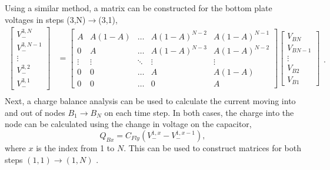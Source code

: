 \documentclass[conference]{article}
\begin{document}
	Using a similar method, a matrix can be constructed for the bottom plate voltages in steps (3,N)$\rightarrow$(3,1),
	\begin{equation}
	\begin{split}
	\begin{bmatrix}
	V_-^{3,N} \\
	V_-^{3,N-1} \\
	\vdots\\
	V_-^{3,2} \\ 
	V_-^{3,1}
	\end{bmatrix}
	&\!=\!
	\begin{bmatrix}
	A \!& A(1-A) & \dots & A(1\!-\!A)^{N-2} & A(1\!-\!A)^{N-1} \\
	0 \!& A & \dots & A(1\!-\!A)^{N-3} \! & A(1\!-\!A)^{N-2}\\
	\vdots & \vdots & \ddots & \vdots & \vdots \\
	0 \!&  0& \dots & A & A(1-A) \\ 
	0 \!& 0 \!& \dots & 0 & A 
	\end{bmatrix}\!\begin{bmatrix}
	V_{BN} \\
	V_{BN-1} \\
	\vdots \\
	V_{B2} \\
	V_{B1}
	\end{bmatrix}\\
	\end{split}.
	\end{equation}
	Next, a charge balance analysis can be used to calculate the current moving into and out of nodes $B_1 \rightarrow B_N$ on each time step. In both cases, the charge into the node can be calculated using the change in voltage on the capacitor,
	\begin{equation}
	Q_{Bx} = C_{Fly}(V_-^{1,x} - V_-^{1,x-1}),
	\end{equation}
	where $x$ is the index from 1 to $N$. This can be used to construct matrices for both steps $(1,1)\rightarrow(1,N)$ .
\end{document}
